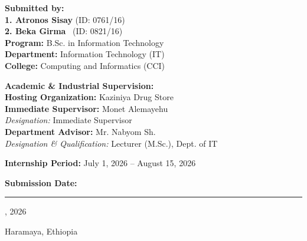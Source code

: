 \begin{titlepage}
\begin{center}
\begin{minipage}[t]{0.48\textwidth}
    \textbf{\large Submitted by:} \\[0.2cm]
    \textbf{1. Atronos Sisay} \quad (ID: 0761/16) \\[0.1cm]
    \textbf{2. Beka Girma} \quad\ (ID: 0821/16) \\[0.2cm]
    \textbf{Program:} B.Sc. in Information Technology \\[0.1cm]
    \textbf{Department:} Information Technology (IT) \\[0.1cm]
    \textbf{College:} Computing and Informatics (CCI)
\end{minipage}
\hfill
\begin{minipage}[t]{0.48\textwidth}
    \textbf{\large Academic \& Industrial Supervision:} \\[0.2cm]
    \textbf{Hosting Organization:} Kaziniya Drug Store \\[0.1cm]
    \textbf{Immediate Supervisor:} Monet Alemayehu \\[0.1cm]
    \textit{Designation:} Immediate Supervisor \\[0.2cm]
    \textbf{Department Advisor:} Mr. Nabyom Sh. \\[0.1cm]
    \textit{Designation \& Qualification:} Lecturer (M.Sc.), Dept. of IT
\end{minipage}

\vfill

{\large\textbf{Internship Period:} July 1, 2026 -- August 15, 2026\par}
\vspace{0.2cm}
{\large\textbf{Submission Date:} \rule{3.5cm}{0.4pt}, 2026\par}
\vspace{0.2cm}
{\normalsize Haramaya, Ethiopia\par}

\end{center}
\end{titlepage}
